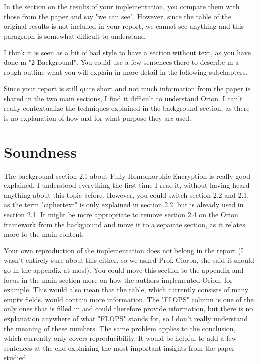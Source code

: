 \documentclass[a4paper]{article}
\begin{document}
In the section on the results of your implementation, you compare them with those from the paper and say "we can see". However, since the table of the original results is not included in your report, we cannot see anything and this paragraph is somewhat difficult to understand. 

I think it is seen as a bit of bad style to have a section without text, as you have done in "2 Background". You could use a few sentences there to describe in a rough outline what you will explain in more detail in the following subchapters.

Since your report is still quite short and not much information from the paper is shared in the two main sections, I find it difficult to understand Orion. I can't really contextualize the techniques explained in the background section, as there is no explanation of how and for what purpose they are used. 

\section{Soundness} %
The background section 2.1 about Fully Homomorphic Encryption is really good explained, I understood everything the first time I read it, without having heard anything about this topic before. However, you could switch section 2.2 and 2.1, as the term "ciphertext" is only explained in section 2.2, but is already used in section 2.1. It might be more appropriate to remove section 2.4 on the Orion framework from the background and move it to a separate section, as it relates more to the main content. 

Your own reproduction of the implementation does not belong in the report (I wasn't entirely sure about this either, so we asked Prof. Ciorba, she said it should go in the appendix at most). You could move this section to the appendix and focus in the main section more on how the authors implemented Orion, for example. This would also mean that the table, which currently consists of many empty fields, would contain more information. The "FLOPS" column is one of the only ones that is filled in and could therefore provide information, but there is no explanation anywhere of what "FLOPS" stands for, so I don't really understand the meaning of these numbers. The same problem applies to the conclusion, which currently only covers reproducibility. It would be helpful to add a few sentences at the end explaining the most important insights from the paper studied. 
\end{document}
